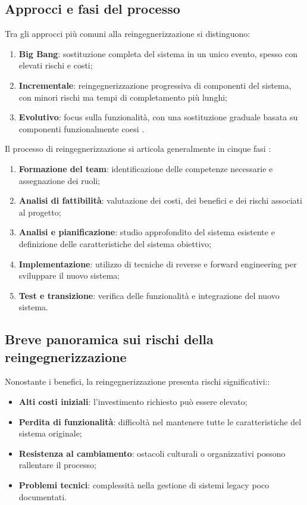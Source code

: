 \subsection{Approcci e fasi del processo}
Tra gli approcci più comuni alla reingegnerizzazione si distinguono:
\begin{enumerate}
  \item \textbf{Big Bang}: sostituzione completa del sistema in un unico evento, spesso con elevati rischi e costi;
  \item \textbf{Incrementale}: reingegnerizzazione progressiva di componenti del sistema, con minori rischi ma tempi di completamento più lunghi;
  \item \textbf{Evolutivo}: focus sulla funzionalità, con una sostituzione graduale basata su componenti funzionalmente coesi \cite{Majthoub2018}.
\end{enumerate}

Il processo di reingegnerizzazione si articola generalmente in cinque fasi \cite{rosenberg1996software}:
\begin{enumerate}
  \item \textbf{Formazione del team}: identificazione delle competenze necessarie e assegnazione dei ruoli;
  \item \textbf{Analisi di fattibilità}: valutazione dei costi, dei benefici e dei rischi associati al progetto;
  \item \textbf{Analisi e pianificazione}: studio approfondito del sistema esistente e definizione delle caratteristiche del sistema obiettivo;
  \item \textbf{Implementazione}: utilizzo di tecniche di reverse e forward engineering per sviluppare il nuovo sistema;
  \item \textbf{Test e transizione}: verifica delle funzionalità e integrazione del nuovo sistema\cite{rosenberg1996software}.
\end{enumerate}

\subsection{Breve panoramica sui rischi della reingegnerizzazione}
Nonostante i benefici, la reingegnerizzazione presenta rischi significativi:\cite{Majthoub2018}:
\begin{itemize}
  \item \textbf{Alti costi iniziali}: l'investimento richiesto può essere elevato;
  \item \textbf{Perdita di funzionalità}: difficoltà nel mantenere tutte le caratteristiche del sistema originale;
  \item \textbf{Resistenza al cambiamento}: ostacoli culturali o organizzativi possono rallentare il processo;
  \item \textbf{Problemi tecnici}: complessità nella gestione di sistemi legacy poco documentati.
\end{itemize}
